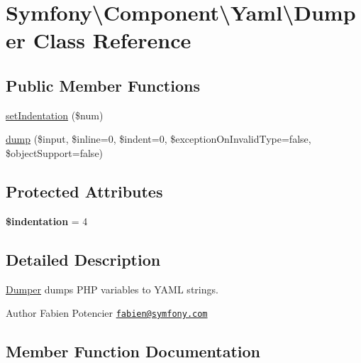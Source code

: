 \hypertarget{classSymfony_1_1Component_1_1Yaml_1_1Dumper}{}\section{Symfony\textbackslash{}Component\textbackslash{}Yaml\textbackslash{}Dumper Class Reference}
\label{classSymfony_1_1Component_1_1Yaml_1_1Dumper}
\subsection*{Public Member Functions}
\begin{DoxyCompactItemize}
\item 
\hyperlink{classSymfony_1_1Component_1_1Yaml_1_1Dumper_a91c1c07d6c308765f847da36698e6a8e}{set\+Indentation} (\$num)
\item 
\hyperlink{classSymfony_1_1Component_1_1Yaml_1_1Dumper_a4f487882131ae36130a00c7c8c0c232e}{dump} (\$input, \$inline=0, \$indent=0, \$exception\+On\+Invalid\+Type=false, \$object\+Support=false)
\end{DoxyCompactItemize}
\subsection*{Protected Attributes}
\begin{DoxyCompactItemize}
\item 
{\bfseries \$indentation} = 4\hypertarget{classSymfony_1_1Component_1_1Yaml_1_1Dumper_a9820c31e7372d0cfa1128b5ba2eeca43}{}\label{classSymfony_1_1Component_1_1Yaml_1_1Dumper_a9820c31e7372d0cfa1128b5ba2eeca43}

\end{DoxyCompactItemize}


\subsection{Detailed Description}
\hyperlink{classSymfony_1_1Component_1_1Yaml_1_1Dumper}{Dumper} dumps P\+HP variables to Y\+A\+ML strings.

\begin{DoxyAuthor}{Author}
Fabien Potencier \href{mailto:fabien@symfony.com}{\tt fabien@symfony.\+com} 
\end{DoxyAuthor}


\subsection{Member Function Documentation}
